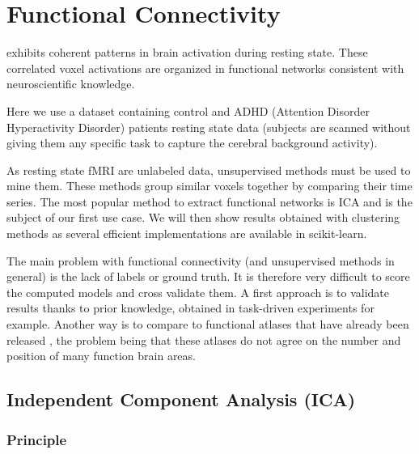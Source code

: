\documentclass{frontiersSCNS} %
\begin{document}
\section{Functional Connectivity}

\cite{biswal1995} exhibits coherent patterns in
brain activation during resting state. These correlated voxel activations are
organized in functional networks consistent with neuroscientific knowledge.


Here we use a dataset containing control and ADHD
(Attention Disorder Hyperactivity Disorder) patients
resting state data (subjects are scanned without giving them any specific task
to capture the cerebral background activity).

As resting state fMRI are unlabeled data, unsupervised methods must be used to
mine them. These methods group similar voxels together by comparing their time
series.
The most popular method to extract functional networks is ICA and
is the subject of our first use case. We will then show results obtained with
clustering methods as several efficient implementations are available in
scikit-learn.

The main problem with functional connectivity (and unsupervised methods in
general) is the lack of labels or ground truth. It is therefore very difficult
to score the computed models and cross validate them. A first approach is to
validate results thanks to prior knowledge, obtained in task-driven experiments
for example. Another way is to compare to functional atlases that have already
been released \citep{craddock2011,yeo2011}, the problem being that these atlases
do not agree on the number
and position of many function brain areas.

\subsection{Independent Component Analysis (ICA)}

\subsubsection{Principle}
\end{document}
